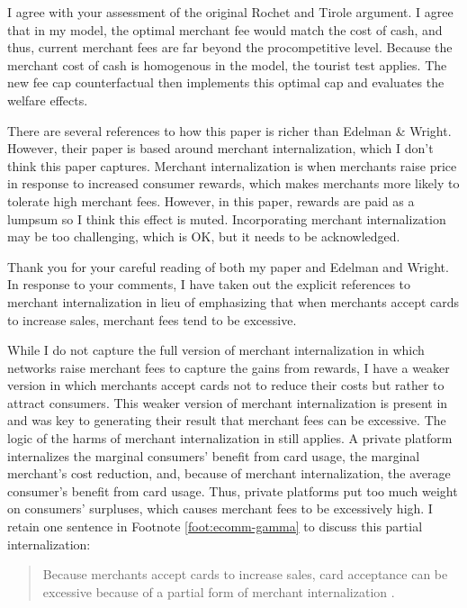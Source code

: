 \documentclass[main.tex]{subfiles}
\begin{document}
\begin{refsection}
I agree with your assessment of the original Rochet and Tirole argument.
I agree that in my model, the optimal merchant fee would match the cost of cash, and thus, current merchant fees are far beyond the procompetitive level.
Because the merchant cost of cash is homogenous in the model, the tourist test \parencite{Rochet.Tirole2011} applies.
The new fee cap counterfactual then implements this optimal cap and evaluates the welfare effects.

\begin{refcomment}
There are several references to how this paper is richer than Edelman \& Wright.
However, their paper is based around merchant internalization, which I don’t think this paper captures.
Merchant internalization is when merchants raise price in response to increased consumer rewards, which makes merchants more likely to tolerate high merchant fees.
However, in this paper, rewards are paid as a lumpsum so I think this effect is muted.
Incorporating merchant internalization may be too challenging, which is OK, but it needs to be acknowledged.
\end{refcomment}

Thank you for your careful reading of both my paper and Edelman and Wright.
In response to your comments, I have taken out the explicit references to merchant internalization in lieu of emphasizing that when merchants accept cards to increase sales, merchant fees tend to be excessive.

While I do not capture the full version of merchant internalization in which networks raise merchant fees to capture the gains from rewards, I have a weaker version in which merchants accept cards not to reduce their costs but rather to attract consumers.
This weaker version of merchant internalization is present in \textcite{Rochet.Tirole2002} and was key to generating their result that merchant fees can be excessive.
The logic of the harms of merchant internalization in \textcite{Wright2012} still applies.
A private platform internalizes the marginal consumers' benefit from card usage, the marginal merchant's cost reduction, and, because of merchant internalization, the average consumer's benefit from card usage.
Thus, private platforms put too much weight on consumers' surpluses, which causes merchant fees to be excessively high.
I retain one sentence in Footnote \ref{foot:ecomm-gamma} to discuss this partial internalization:

\begin{quote}
    Because merchants accept cards to increase sales, card acceptance can be excessive because of a partial form of merchant internalization \parencite{Rochet.Tirole2002,Wright2012}.
\end{quote}


\end{refsection}
\end{document}
